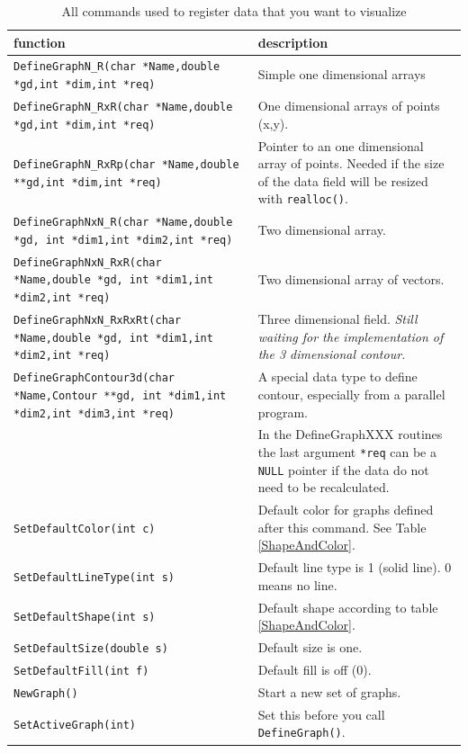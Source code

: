 \documentclass[12pt,letterpaper]{article}
\begin{document}
\begin{table}
\begin{center}
\begin{tabular}{|p{}|p{}|}
\hline
function & description\\
\hline
\texttt{DefineGraphN\_R(char *Name,double *gd,int *dim,int *req)}&
Simple one dimensional arrays\\
\texttt{DefineGraphN\_RxR(char *Name,double *gd,int *dim,int *req)}&
One dimensional arrays of points (x,y).\\
\texttt{DefineGraphN\_RxRp(char *Name,double **gd,int *dim,int *req)}&
Pointer to an one dimensional array of points. Needed if the size of
the data field will be resized with \texttt{realloc()}.\\
\texttt{DefineGraphNxN\_R(char *Name,double *gd,
                      int *dim1,int *dim2,int *req)}& Two dimensional array.\\
\texttt{DefineGraphNxN\_RxR(char *Name,double *gd,
                      int *dim1,int *dim2,int *req)}& Two dimensional
array of vectors.\\
\texttt{DefineGraphNxN\_RxRxRt(char *Name,double *gd,
                      int *dim1,int *dim2,int *req)}& Three
dimensional field. \textit{Still waiting for the implementation of the
 3 dimensional contour.}\\
\texttt{DefineGraphContour3d(char *Name,Contour **gd,
                      int *dim1,int *dim2,int *dim3,int *req)}& A
special data type to define contour, especially from a parallel program.\\
&In the DefineGraphXXX routines the last argument \texttt{*req} can be
a \texttt{NULL} pointer if the data do not need to be recalculated.\\
\hline
\texttt{SetDefaultColor(int c)}&Default color for graphs
defined after this command. See Table \ref{ShapeAndColor}.\\
\texttt{SetDefaultLineType(int s)}& Default line type is 1 (solid
line). 0 means no line. \\
\texttt{SetDefaultShape(int s)}& Default shape according to table 
\ref{ShapeAndColor}.\\
\texttt{SetDefaultSize(double s)}& Default size is one.\\
\texttt{SetDefaultFill(int f)}& Default fill is off (0).\\
\hline
\texttt{NewGraph()}& Start a new set of graphs.\\
\texttt{SetActiveGraph(int)}& Set this before you call 
\texttt{DefineGraph()}.\\
\hline
\end{tabular}
\end{center}
\label{graphcommands}
\caption{All commands used to register data that you want to
  visualize}
\end{table}
\end{document}
